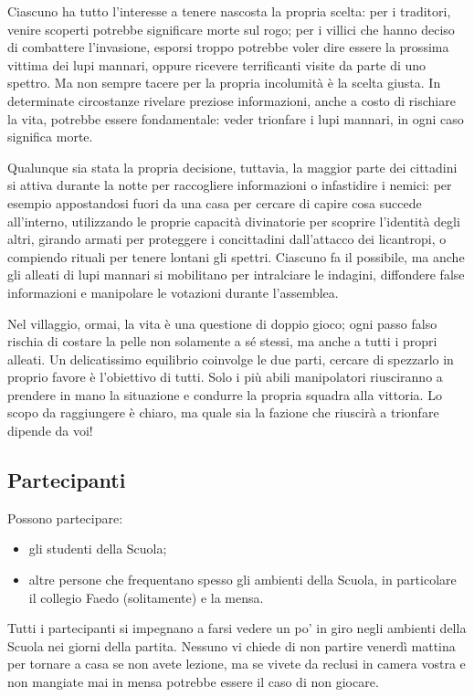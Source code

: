 \documentclass[a4paper,10pt]{article}
\begin{document}
Ciascuno ha tutto l'interesse a tenere nascosta la propria scelta: per i traditori, venire scoperti potrebbe significare morte sul rogo; per i villici che hanno deciso di combattere l'invasione, esporsi troppo potrebbe voler dire essere la prossima vittima dei lupi mannari, oppure ricevere terrificanti visite da parte di uno spettro. Ma non sempre tacere per la propria incolumità è la scelta giusta. In determinate circostanze rivelare preziose informazioni, anche a costo di rischiare la vita, potrebbe essere fondamentale: veder trionfare i lupi mannari, in ogni caso significa morte.

Qualunque sia stata la propria decisione, tuttavia, la maggior parte dei cittadini si attiva durante la notte per raccogliere informazioni o infastidire i nemici: per esempio appostandosi fuori da una casa per cercare di capire cosa succede all'interno, utilizzando le proprie capacità divinatorie per scoprire l'identità degli altri, girando armati per proteggere i concittadini dall'attacco dei licantropi, o compiendo rituali per tenere lontani gli spettri. Ciascuno fa il possibile, ma anche gli alleati di lupi mannari si mobilitano per intralciare le indagini, diffondere false informazioni e manipolare le votazioni durante l'assemblea.

Nel villaggio, ormai, la vita è una questione di doppio gioco; ogni passo falso rischia di costare la pelle non solamente a sé stessi, ma anche a tutti i propri alleati. Un delicatissimo equilibrio coinvolge le due parti, cercare di spezzarlo in proprio favore è l'obiettivo di tutti. Solo i più abili manipolatori riusciranno a prendere in mano la situazione e condurre la propria squadra alla vittoria. Lo scopo da raggiungere è chiaro, ma quale sia la fazione che riuscirà a trionfare dipende da voi!

\subsection{Partecipanti}

Possono partecipare:

\begin{itemize}
	\item gli studenti della Scuola;
	\item altre persone che frequentano spesso gli ambienti della Scuola, in particolare il collegio Faedo (solitamente) e la mensa.
\end{itemize}

Tutti i partecipanti si impegnano a farsi vedere un po' in giro negli ambienti della Scuola nei giorni della partita. Nessuno vi chiede di non partire venerdì mattina per tornare a casa se non avete lezione, ma se vivete da reclusi in camera vostra e non mangiate mai in mensa potrebbe essere il caso di non giocare.
\end{document}
